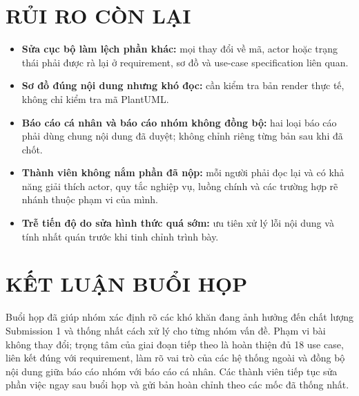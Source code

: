 \documentclass[10pt,a4paper]{article}
\begin{document}
\section{RỦI RO CÒN LẠI}

\begin{itemize}
  \item \textbf{Sửa cục bộ làm lệch phần khác:} mọi thay đổi về mã, actor hoặc trạng thái phải được rà lại ở requirement, sơ đồ và use-case specification liên quan.
  \item \textbf{Sơ đồ đúng nội dung nhưng khó đọc:} cần kiểm tra bản render thực tế, không chỉ kiểm tra mã PlantUML.
  \item \textbf{Báo cáo cá nhân và báo cáo nhóm không đồng bộ:} hai loại báo cáo phải dùng chung nội dung đã duyệt; không chỉnh riêng từng bản sau khi đã chốt.
  \item \textbf{Thành viên không nắm phần đã nộp:} mỗi người phải đọc lại và có khả năng giải thích actor, quy tắc nghiệp vụ, luồng chính và các trường hợp rẽ nhánh thuộc phạm vi của mình.
  \item \textbf{Trễ tiến độ do sửa hình thức quá sớm:} ưu tiên xử lý lỗi nội dung và tính nhất quán trước khi tinh chỉnh trình bày.
\end{itemize}

\section{KẾT LUẬN BUỔI HỌP}

Buổi họp đã giúp nhóm xác định rõ các khó khăn đang ảnh hưởng đến chất lượng Submission 1 và thống nhất cách xử lý cho từng nhóm vấn đề. Phạm vi bài không thay đổi; trọng tâm của giai đoạn tiếp theo là hoàn thiện đủ 18 use case, liên kết đúng với requirement, làm rõ vai trò của các hệ thống ngoài và đồng bộ nội dung giữa báo cáo nhóm với báo cáo cá nhân. Các thành viên tiếp tục sửa phần việc ngay sau buổi họp và gửi bản hoàn chỉnh theo các mốc đã thống nhất.
\end{document}
